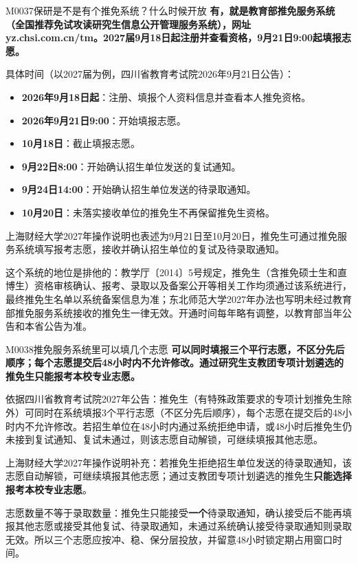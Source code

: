 \begin{qa}{M0037}{保研是不是有个推免系统？什么时候开放}
\textbf{有，就是教育部推免服务系统（全国推荐免试攻读研究生信息公开管理服务系统），网址 yz.chsi.com.cn/tm。2027届9月18日起注册并查看资格，9月21日9:00起填报志愿。}

具体时间（以2027届为例，四川省教育考试院2026年9月21日公告）：

\begin{itemize}
  \item \textbf{2026年9月18日起}：注册、填报个人资料信息并查看本人推免资格。
  \item \textbf{2026年9月21日9:00}：开始填报志愿。
  \item \textbf{10月18日}：截止填报志愿。
  \item \textbf{9月22日8:00}：开始确认招生单位发送的复试通知。
  \item \textbf{9月24日14:00}：开始确认招生单位发送的待录取通知。
  \item \textbf{10月20日}：未落实接收单位的推免生不再保留推免生资格。
\end{itemize}

上海财经大学2027年操作说明也表述为9月21日至10月20日，推免生可通过推免服务系统填写报考志愿，接收并确认招生单位的复试及待录取通知。

这个系统的地位是排他的：教学厅〔2014〕5号规定，推免生（含推免硕士生和直博生）资格审核确认、报考、录取以及备案公开等相关工作均须通过该系统进行，最终推免生名单以系统备案信息为准；东北师范大学2027年办法也写明未经过教育部推免服务系统接收的推免生一律无效。开通时间每年略有调整，以教育部当年公告和本省公告为准。
\end{qa}

\begin{qa}{M0038}{推免服务系统里可以填几个志愿}
\textbf{可以同时填报三个平行志愿，不区分先后顺序；每个志愿提交后48小时内不允许修改。通过研究生支教团专项计划遴选的推免生只能报考本校专业志愿。}

依据四川省教育考试院2027年公告：推免生（有特殊政策要求的专项计划推免生除外）可同时在系统填报3个平行志愿（不区分先后顺序），每个志愿在提交后的48小时内不允许修改。若招生单位在48小时内通过系统拒绝申请，或48小时后推免生仍未接到复试通知、复试未通过，则该志愿自动解锁，可继续填报其他志愿。

上海财经大学2027年操作说明补充：若推免生拒绝招生单位发送的待录取通知，该志愿自动解锁，可继续填报其他志愿；通过支教团专项计划遴选的推免生\textbf{只能选择报考本校专业志愿}。

志愿数量不等于录取数量：推免生只能接受\textbf{一个}待录取通知，确认接受后不能再填报其他志愿或接受其他复试、待录取通知，未通过系统确认接受待录取通知则录取无效。所以三个志愿应按冲、稳、保分层投放，并留意48小时锁定期占用窗口时间。
\end{qa}

